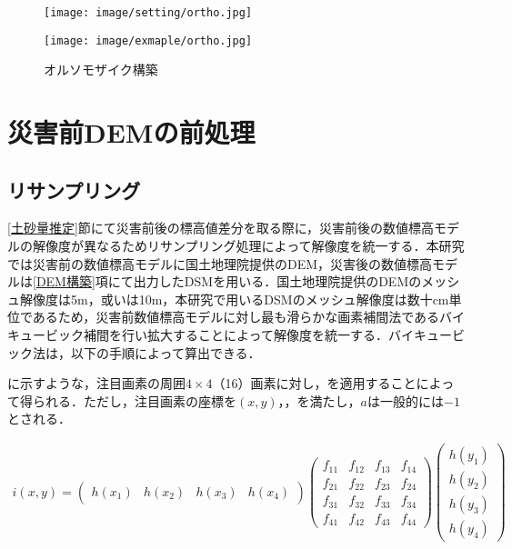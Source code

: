       \begin{figure}[t]
        \begin{minipage}[c]{0.45\hsize}
          \centering
          \texttt{[image: image/setting/ortho.jpg]}
          \label{オルソモザイク構築設定値}
        \end{minipage}
        \begin{minipage}[c]{0.45\hsize}
          \centering
          \texttt{[image: image/exmaple/ortho.jpg]}
          \label{オルソモザイク構築結果}
        \end{minipage}
        \caption{オルソモザイク構築}
      \end{figure}


  \section{災害前DEMの前処理}
    \subsection{リサンプリング}
      \ref{土砂量推定}節にて災害前後の標高値差分を取る際に，災害前後の数値標高モデルの解像度が異なるためリサンプリング処理によって解像度を統一する．本研究では災害前の数値標高モデルに国土地理院提供のDEM，災害後の数値標高モデルは\ref{DEM構築}項にて出力したDSMを用いる．国土地理院提供のDEMのメッシュ解像度は5m，或いは10m，本研究で用いるDSMのメッシュ解像度は数十cm単位であるため，災害前数値標高モデルに対し最も滑らかな画素補間法であるバイキュービック補間\cite{バイキュービック法}を行い拡大することによって解像度を統一する．バイキュービック法は，以下の手順によって算出できる．
      
      に示すような，注目画素の周囲$4\times4$（16）画素に対し，を適用することによって得られる．ただし，注目画素の座標を$(x,y)$，，を満たし，$a$は一般的には$-1$とされる．

      \begin{eqnarray}
        \label{バイキュービック法1}
        i(x,y) = 
        \begin{pmatrix}
        h(x_{1}) & h(x_{2}) & h(x_{3}) & h(x_{4})
        \end{pmatrix}
        \begin{pmatrix}
          f_{11} & f_{12} & f_{13} & f_{14} \\
          f_{21} & f_{22} & f_{23} & f_{24} \\
          f_{31} & f_{32} & f_{33} & f_{34} \\
          f_{41} & f_{42} & f_{43} & f_{44}
        \end{pmatrix}
        \begin{pmatrix}
          h(y_{1}) \\ h(y_{2}) \\ h(y_{3}) \\ h(y_{4})
        \end{pmatrix}
      \end{eqnarray}
  

